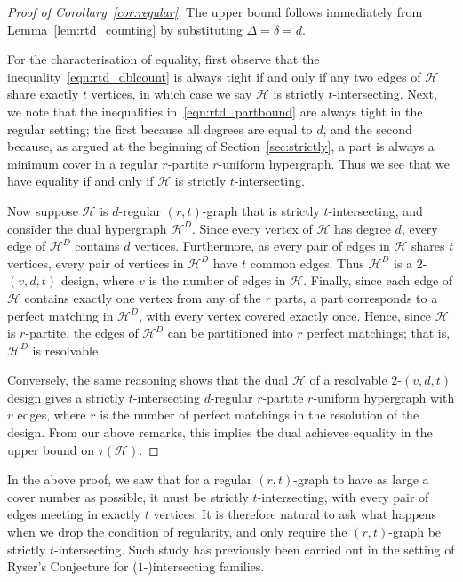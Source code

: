 \documentclass[a4paper,twoside,11pt]{article}
\numberwithin{thm}{section}
\theoremstyle{definition}
\theoremstyle{remark}
\theoremstyle{definition}
\newcommand{\m}[1]{\mathcal{#1}}
\begin{document}
\begin{proof}[Proof of Corollary~\ref{cor:regular}]
The upper bound follows immediately from Lemma~\ref{lem:rtd_counting} by substituting $\Delta = \delta = d$.

For the characterisation of equality, first observe that the inequality~\eqref{eqn:rtd_dblcount} is always tight if and only if any two edges of $\m H$ share exactly $t$ vertices, in which case we say $\m H$ is strictly $t$-intersecting. Next, we note that the inequalities in~\eqref{eqn:rtd_partbound} are always tight in the regular setting; the first because all degrees are equal to $d$, and the second because, as argued at the beginning of Section~\ref{sec:strictly},  a part is always a minimum cover in a regular $r$-partite $r$-uniform hypergraph. Thus we see that we have equality if and only if $\m H$ is strictly $t$-intersecting.

Now suppose $\m H$ is $d$-regular $(r,t)$-graph that is strictly $t$-intersecting, and consider the dual hypergraph $\m H^D$. Since every vertex of $\m H$ has degree $d$, every edge of $\m H^D$ contains $d$ vertices. Furthermore, as every pair of edges in $\m H$ shares $t$ vertices, every pair of vertices in $\m H^D$ have $t$ common edges. Thus $\m H^D$ is a $2$-$(v,d,t)$ design, where $v$ is the number of edges in $\m H$. Finally, since each edge of $\m H$ contains exactly one vertex from any of the $r$ parts, a part corresponds to a perfect matching in $\m H^D$, with every vertex covered exactly once. Hence, since $\m H$ is $r$-partite, the edges of $\m H^D$ can be partitioned into $r$ perfect matchings; that is, $\m H^D$ is resolvable.

Conversely, the same reasoning shows that the dual $\m H$ of a resolvable $2$-$(v,d,t)$ design gives a strictly $t$-intersecting $d$-regular $r$-partite $r$-uniform hypergraph with $v$ edges, where $r$ is the number of perfect matchings in the resolution of the design. From our above remarks, this implies the dual achieves equality in the upper bound on $\tau(\m H)$.
\end{proof}

In the above proof, we saw that for a regular $(r,t)$-graph to have as large a cover number as possible, it must be strictly $t$-intersecting, with every pair of edges meeting in exactly $t$ vertices. It is therefore natural to ask what happens when we drop the condition of regularity, and only require the $(r,t)$-graph be strictly $t$-intersecting. Such study has previously been carried out in the setting of Ryser's Conjecture for ($1$-)intersecting families.
\end{document}
